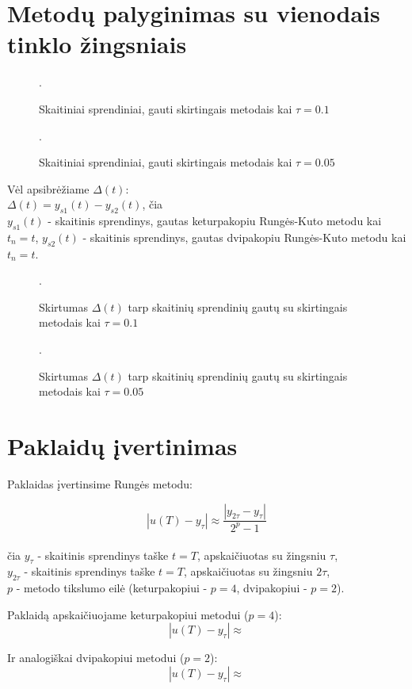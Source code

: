 \documentclass[]{VUMIFTemplateClass}
\newcommand{\tone}{0.1}
\newcommand{\ttwo}{0.05}
\begin{document}
\section{Metodų palyginimas su vienodais tinklo žingsniais}

\begin{figure}[H]
    \begin{center}
        
    \end{center}
    \caption{Skaitiniai sprendiniai, gauti skirtingais metodais kai $\tau = \tone$}.
\end{figure}

\begin{figure}[H]
    \begin{center}
        
    \end{center}
    \caption{Skaitiniai sprendiniai, gauti skirtingais metodais kai $\tau = \ttwo$}.
\end{figure}

Vėl apsibrėžiame $\Delta(t)$:\\
$\Delta(t) = y_{s1}(t) - y_{s2}(t)$, čia\\
$y_{s1}(t)$ - skaitinis sprendinys, gautas keturpakopiu Rungės-Kuto metodu kai $t_n = t$,
$y_{s2}(t)$ - skaitinis sprendinys, gautas dvipakopiu Rungės-Kuto metodu kai $t_n = t$.

\begin{figure}[H]
    \begin{center}
        
    \end{center}
    \caption{Skirtumas $\Delta(t)$ tarp skaitinių sprendinių gautų su skirtingais metodais kai $\tau = \tone$}.
\end{figure}

\begin{figure}[H]
    \begin{center}
        
    \end{center}
    \caption{Skirtumas $\Delta(t)$ tarp skaitinių sprendinių gautų su skirtingais metodais kai $\tau = \ttwo$}.
\end{figure}

\section{Paklaidų įvertinimas}
Paklaidas įvertinsime Rungės metodu:

\[ |u(T) - y_{\tau}| \approx \frac{|y_{2 \tau} - y_{\tau}|}{2^p - 1} \]\\
čia $y_{\tau}$ - skaitinis sprendinys taške $t = T$, apskaičiuotas su žingsniu $\tau$,\\
$y_{2 \tau}$ - skaitinis sprendinys taške $t = T$, apskaičiuotas su žingsniu $2 \tau$,\\
$p$ - metodo tikslumo eilė (keturpakopiui - $p = 4$, dvipakopiui - $p = 2$).

Paklaidą apskaičiuojame keturpakopiui metodui ($p = 4$):
\[ |u(T) - y_{\tau}| \approx  \]

Ir analogiškai dvipakopiui metodui ($p = 2$):
\[ |u(T) - y_{\tau}| \approx  \]
\end{document}
